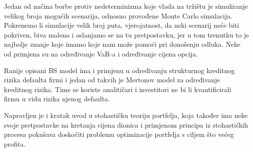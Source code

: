 \documentclass[times, utf8, seminar]{fer}
\begin{document}
Jedan od načina borbe protiv nedeterminizma koje vlada na tržištu je simuliranje velikog broja mogućih scenarija, odnosno provođene Monte Carlo simulacija. Pokrenemo li simulacije velik broj puta, vjerojatnost, da neki scenarij neće biti pokriven, biva malena i oslanjamo se na tu pretpostavku, jer u tom trenutku to je najbolje znanje koje imamo koje nam može pomoći pri donošenju odluka. Neke od primjena su na određivanje VaR-a i određivanje cijena opcija.

Ranije opisani BS model ima i primjenu u određivanju strukturnog kreditnog rizika defaulta firmi i jedan od takvih je Mertonov model za određivanje kreditnog rizika. Time se koriste analitičari i investitori ne bi li kvantificirali firmu u vidu rizika njenog defaulta.

Napravljen je i kratak uvod u stohastičku teoriju portfelja, koja također ima neke svoje pretpostavke na kretanja cijena dionica i primjenom principa iz stohastičkih procesa pokušava doskočiti problemu optimizacije portfelja s ciljem što većeg profita.
\end{document}
